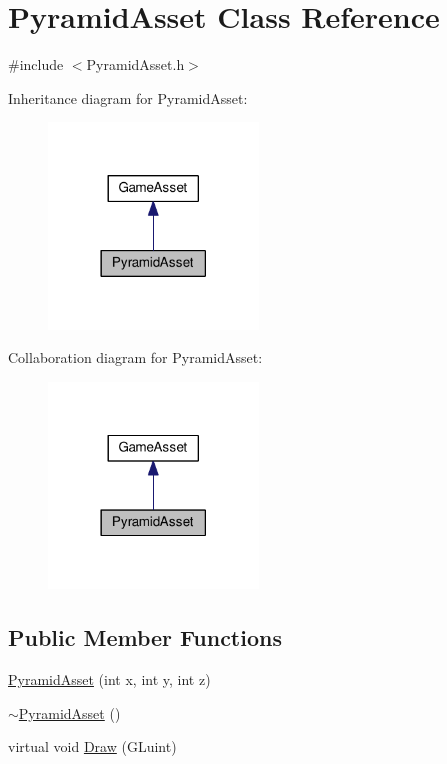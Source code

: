 \hypertarget{class_pyramid_asset}{}\section{Pyramid\+Asset Class Reference}
\label{class_pyramid_asset}


{\ttfamily \#include $<$Pyramid\+Asset.\+h$>$}



Inheritance diagram for Pyramid\+Asset\+:
\nopagebreak
\begin{figure}[H]
\begin{center}
\leavevmode
\includegraphics[width=158pt]{class_pyramid_asset__inherit__graph}
\end{center}
\end{figure}


Collaboration diagram for Pyramid\+Asset\+:
\nopagebreak
\begin{figure}[H]
\begin{center}
\leavevmode
\includegraphics[width=158pt]{class_pyramid_asset__coll__graph}
\end{center}
\end{figure}
\subsection*{Public Member Functions}
\begin{DoxyCompactItemize}
\item 
\hyperlink{class_pyramid_asset_a9416c9f36aebef2bf217fc8f3bdf08ce}{Pyramid\+Asset} (int x, int y, int z)
\item 
\hyperlink{class_pyramid_asset_afb388a196f43a3808b2d4f6fdb89ee84}{$\sim$\+Pyramid\+Asset} ()
\item 
virtual void \hyperlink{class_pyramid_asset_aaea45da4956d79ec9ab96e9d0ccef3fe}{Draw} (G\+Luint)
\end{DoxyCompactItemize}


